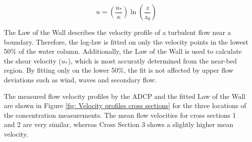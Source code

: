\begin{equation}
    u = \left( \frac{u_*}{\kappa} \right) \ln\left( \frac{z}{z_0} \right)
    \label{eq:law_of_the_wall}
\end{equation}

The Law of the Wall describes the velocity profile of a turbulent flow near a boundary. Therefore, the log-law is fitted on only the velocity points in the lowest 50\% of the water column. Additionally, the Law of the Wall is used to calculate the shear velocity ($u_*$), which is most accuratly determined from the near-bed region. By fitting only on the lower 50\%, the fit is not affected by upper flow deviations such as wind, waves and secondary flow. 

The measured flow velocity profiles by the ADCP and the fitted Law of the Wall are shown in Figure \ref{fig: Velocity profiles cross sections} for the three locations of the concentration measurements. The mean flow velocities for cross sections 1 and 2 are very similar, whereas Cross Section 3 shows a slightly higher mean velocity.

